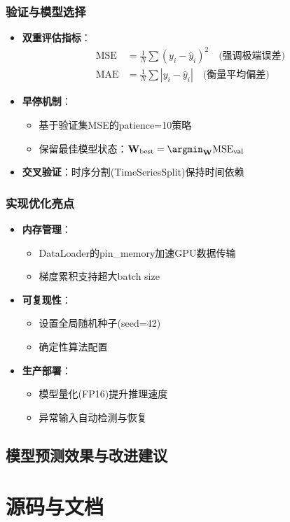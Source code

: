 \documentclass[a4paper,12pt]{ctexart}
\begin{document}
\subsubsection{验证与模型选择}
\begin{itemize}
\item \textbf{双重评估指标}：
  \begin{align*}
  \text{MSE} &= \frac{1}{N}\sum(y_i-\hat{y}_i)^2 \quad \text{(强调极端误差)} \\
  \text{MAE} &= \frac{1}{N}\sum|y_i-\hat{y}_i| \quad \text{(衡量平均偏差)}
  \end{align*}
  
\item \textbf{早停机制}：
  \begin{itemize}
  \item 基于验证集MSE的patience=10策略
  \item 保留最佳模型状态：$\mathbf{W}_{\text{best}} = \argmin_{\mathbf{W}} \text{MSE}_{\text{val}}$
  \end{itemize}
  
\item \textbf{交叉验证}：时序分割(TimeSeriesSplit)保持时间依赖
\end{itemize}

\subsubsection{实现优化亮点}
\begin{itemize}
\item \textbf{内存管理}：
  \begin{itemize}
  \item DataLoader的pin\_memory加速GPU数据传输
  \item 梯度累积支持超大batch size
  \end{itemize}
  
\item \textbf{可复现性}：
  \begin{itemize}
  \item 设置全局随机种子(seed=42)
  \item 确定性算法配置
  \end{itemize}
  
\item \textbf{生产部署}：
  \begin{itemize}
  \item 模型量化(FP16)提升推理速度
  \item 异常输入自动检测与恢复
  \end{itemize}
\end{itemize}

\newpage
\subsection{模型预测效果与改进建议}

\newpage
\section{源码与文档}
\end{document}
